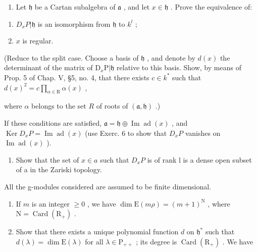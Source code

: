 \begin{enumerate}
\def\labelenumi{\alph{enumi})}
\tightlist
\item
  Let \(\mathfrak{h}\) be a Cartan subalgebra of \(\mathfrak{a}\) , and let \(x \in \mathfrak{h}\) . Prove the equivalence of:
\end{enumerate}

\begin{enumerate}
\def\labelenumi{(\roman{enumi})}
\item
  \(D_{x}P|\mathfrak{h}\) is an isomorphism from \(\mathfrak{h}\) to \(k^{l}\) ;
\item
  \(x\) is regular.
\end{enumerate}

(Reduce to the split case. Choose a basis of \(\mathfrak{h}\) , and denote by \(d(x)\) the determinant of the matrix of \(\mathrm{D}_x\mathrm{P}|\mathfrak{h}\) relative to this basis. Show, by means of Prop. 5 of Chap. V, §5, no. 4, that there exists \(c \in k^*\) such that \(d(x)^2 = c \prod_{\alpha \in \mathrm{R}} \alpha(x)\) ,

where \(\alpha\) belongs to the set \(R\) of roots of \((\mathfrak{a},\mathfrak{h})\) .)

If these conditions are satisfied, \(\mathfrak{a} = \mathfrak{h} \oplus \operatorname{Im} \operatorname{ad}(x)\) , and \(\operatorname{Ker} D_x P = \operatorname{Im} \operatorname{ad}(x)\) (use Exerc. 6 to show that \(D_x P\) vanishes on \(\operatorname{Im} \operatorname{ad}(x)\) ).

\begin{enumerate}
\def\labelenumi{\alph{enumi})}
\setcounter{enumi}{1}
\tightlist
\item
  Show that the set of \(x \in a\) such that \(D_{x}P\) is of rank l is a dense open subset of a in the Zariski topology.
\end{enumerate}


All the g-modules considered are assumed to be finite dimensional.

\begin{enumerate}
\def\labelenumi{\arabic{enumi})}
\item
  If \(m\) is an integer \(\geq 0\) , we have \(\dim \mathrm{E}(m\rho) = (m + 1)^{\mathrm{N}}\) , where \(\mathrm{N} = \operatorname{Card}(\mathrm{R}_{+})\) .
\item
  Show that there exists a unique polynomial function \(d\) on \(\mathfrak{h}^*\) such that \(d(\lambda) = \dim \mathrm{E}(\lambda)\) for all \(\lambda \in \mathrm{P}_{++}\) ; its degree is \(\operatorname{Card}(\mathrm{R}_+)\) . We have
\end{enumerate}

